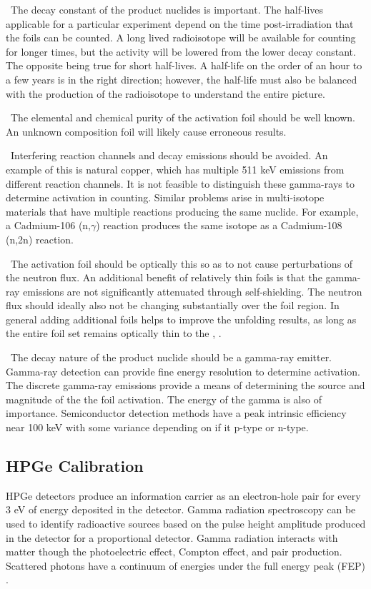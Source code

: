 \documentclass[journal]{IEEEtran}
\begin{document}
	\ The decay constant of the product nuclides is important. The 
	half-lives applicable for a particular experiment depend on the time 
	post-irradiation that the foils can be counted. A long lived radioisotope 
	will be available for counting for longer times, but the activity will be 
	lowered from the lower decay constant. The opposite being true for short 
	half-lives. A half-life on the order of an hour to a few years is in the 
	right direction; however, the half-life must also be balanced with the 
	production of the radioisotope to understand the entire picture. 
	
	\ The elemental and chemical purity of the activation foil should be 
	well known. An unknown composition foil will likely cause erroneous 
	results. 
	
	\ Interfering reaction channels and decay emissions should be avoided. 
	An example of this is natural copper, which has multiple 511 keV emissions 
	from different reaction channels. It is not feasible to distinguish these 
	gamma-rays to determine activation in counting. Similar problems arise in 
	multi-isotope materials that have multiple reactions producing the same 
	nuclide. For example, a Cadmium-106 (n,$\gamma$) reaction produces the same 
	isotope as a Cadmium-108 (n,2n) reaction. 
	
	\ The activation foil should be optically this so as to not cause 
	perturbations of the neutron flux. An additional benefit of relatively thin 
	foils is that the gamma-ray emissions are not significantly attenuated 
	through self-shielding. The neutron flux should ideally also not be 
	changing substantially over the foil region. In general adding additional foils helps to improve the unfolding results, as long as the entire foil set remains optically thin to the , \cite{Vagena2018b}. 
	
	\ The decay nature of the product nuclide should be a gamma-ray 
	emitter. Gamma-ray detection can provide fine energy resolution to 
	determine activation. The discrete gamma-ray emissions provide a means of 
	determining the source and magnitude of the the foil activation. The energy 
	of the gamma is also of importance. Semiconductor detection methods have a 
	peak intrinsic efficiency near 100 keV with some variance depending on if 
	it p-type or n-type. 
	
	\subsection{HPGe Calibration}
	HPGe detectors produce an information carrier as an electron-hole pair for every 3 eV of energy deposited in the detector\cite{Leo}.
Gamma radiation spectroscopy can be used to identify radioactive sources based on the pulse height amplitude produced in the detector for a proportional detector. 
Gamma radiation interacts with matter though the photoelectric effect, Compton effect, and pair production. 
Scattered photons have a continuum of energies under the full energy peak (FEP) \cite{Knoll}.
	
\end{document}
